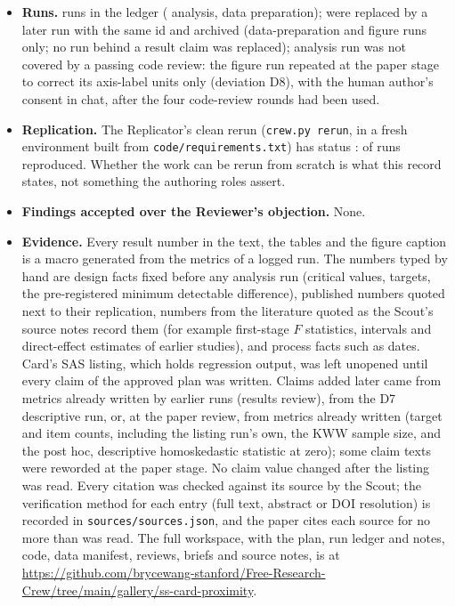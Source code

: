 \begin{itemize}
        finding carried into a later round is counted once, at its latest severity). The last round of each completed stage passed, with minor findings answered
        before the next gate. A code review passed before every analysis run except the D8 figure rerun, including
        separate rounds for the post hoc diagnostic, the SAS-listing check and the D7
        descriptive run.
  \item \textbf{Runs.} \CrewRuns{} runs in the ledger (\CrewRunsAnalysis{} analysis,
        \CrewRunsDataPrep{} data preparation); \CrewRunsSuperseded{} were replaced by a
        later run with the same id and archived (data-preparation and figure runs only; no run
        behind a result claim was replaced); \CrewRunsUnreviewed{} analysis
        run was not covered by a passing code review: the figure run repeated at the paper
        stage to correct its axis-label units only (deviation D8), with the human author's
        consent in chat, after the four code-review rounds had been used.
  \item \textbf{Replication.} The Replicator's clean rerun (\texttt{crew.py rerun}, in a
        fresh environment built from \texttt{code/requirements.txt}) has status
        \CrewRerunStatus{}: \CrewRerunReproduced{} of \CrewRerunTotal{} runs reproduced.
        Whether the work can be rerun from scratch is what this record states, not
        something the authoring roles assert.
  \item \textbf{Findings accepted over the Reviewer's objection.} None.
  \item \textbf{Evidence.} Every result number in the text, the tables and the figure caption
        is a macro generated from the metrics of a logged run. The numbers typed by hand are
        design facts fixed before any analysis run (critical values, targets, the
        pre-registered minimum detectable difference), published numbers quoted next to
        their replication, numbers from the literature quoted as the Scout's source notes
        record them (for example first-stage $F$ statistics, intervals and direct-effect
        estimates of earlier studies), and process facts such as dates. Card's SAS listing,
        which holds regression output, was left unopened until every claim of the approved
        plan was written. Claims added later came from metrics already written by earlier
        runs (results review), from the D7 descriptive run, or, at the paper review, from
        metrics already written (target and item counts, including the listing run's own,
        the KWW sample size, and the post hoc, descriptive homoskedastic statistic at zero);
        some claim texts were reworded at the paper stage. No claim value changed after the
        listing was read. Every
        citation was checked against its source by the Scout; the verification method for
        each entry (full text, abstract or DOI resolution) is recorded in
        \texttt{sources/sources.json}, and the paper cites each source for no more than was
        read. The full workspace, with the plan, run ledger and notes, code, data manifest,
        reviews, briefs and source notes, is at
        \url{https://github.com/brycewang-stanford/Free-Research-Crew/tree/main/gallery/ss-card-proximity}.
\end{itemize}
